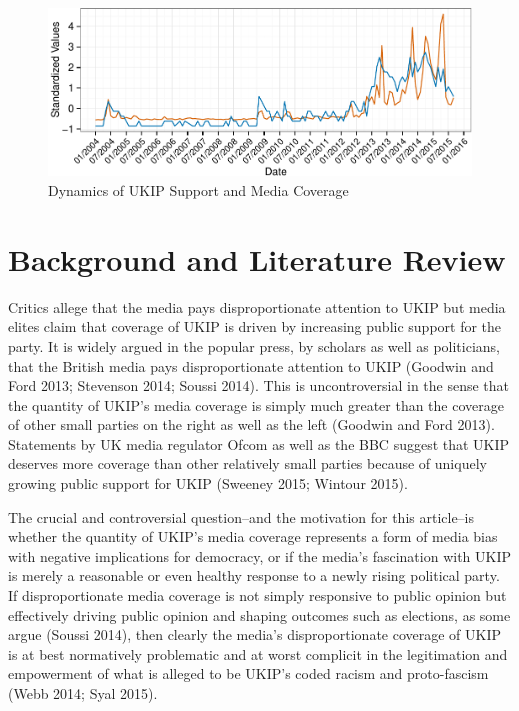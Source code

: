 \documentclass[12pt,article]{article}
\begin{document}
\begin{figure}[htbp]
\centering
\includegraphics{ukip_media_files/figure-latex/unnamed-chunk-2.pdf}
\caption{Dynamics of UKIP Support and Media Coverage}
\end{figure}

\section{Background and Literature
Review}\label{background-and-literature-review}

Critics allege that the media pays disproportionate attention to UKIP
but media elites claim that coverage of UKIP is driven by increasing
public support for the party. It is widely argued in the popular press,
by scholars as well as politicians, that the British media pays
disproportionate attention to UKIP (Goodwin and Ford 2013; Stevenson
2014; Soussi 2014). This is uncontroversial in the sense that the
quantity of UKIP's media coverage is simply much greater than the
coverage of other small parties on the right as well as the left
(Goodwin and Ford 2013). Statements by UK media regulator Ofcom as well
as the BBC suggest that UKIP deserves more coverage than other
relatively small parties because of uniquely growing public support for
UKIP (Sweeney 2015; Wintour 2015).

The crucial and controversial question--and the motivation for this
article--is whether the quantity of UKIP's media coverage represents a
form of media bias with negative implications for democracy, or if the
media's fascination with UKIP is merely a reasonable or even healthy
response to a newly rising political party. If disproportionate media
coverage is not simply responsive to public opinion but effectively
driving public opinion and shaping outcomes such as elections, as some
argue (Soussi 2014), then clearly the media's disproportionate coverage
of UKIP is at best normatively problematic and at worst complicit in the
legitimation and empowerment of what is alleged to be UKIP's coded
racism and proto-fascism (Webb 2014; Syal 2015).
\end{document}
